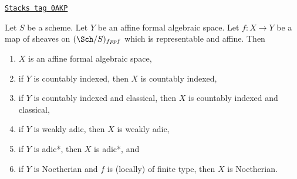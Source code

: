 \begin{lemma}
\label{formal-spaces-lemma-property-goes-up-affine-morphism}
\href{https://stacks.math.columbia.edu/tag/0AKP}{\texttt{Stacks tag 0AKP}}

Let $S$ be a scheme. Let $Y$ be an affine formal algebraic space.
Let $f : X \to Y$ be a map of sheaves on $(\Sch/S)_{fppf}$ which
is representable and affine. Then
\begin{enumerate}
\item $X$ is an affine formal algebraic space,
\item if $Y$ is countably indexed, then $X$ is countably indexed,
\item if $Y$ is countably indexed and classical, then $X$ is
countably indexed and classical,
\item if $Y$ is weakly adic, then $X$ is weakly adic,
\item if $Y$ is adic*, then $X$ is adic*, and
\item if $Y$ is Noetherian and $f$ is (locally) of finite type, then
$X$ is Noetherian.
\end{enumerate}
\end{lemma}

